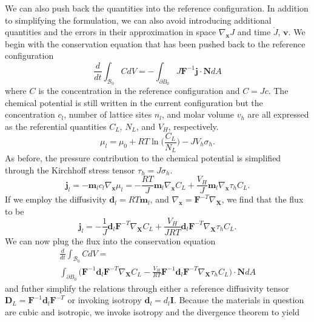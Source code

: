\documentclass[10pt]{elsarticle}
\newcommand{\mbs}[1]{\boldsymbol{#1}}
\def\bs{{\mbs{s}}} \def\bt{{\mbs{t}}} \def\bu{{\mbs{u}}}
\def\bs{\boldsymbol}
\begin{document}
We can also push back the quantities into the reference configuration. In addition to simplifying the formulation, we can also avoid introducing additional quantities and the errors in their approximation in space $\nabla_{\bs{x}}J$ and time  $\dot{J}$, $\bs{v}$. We begin with the conservation equation that has been pushed back to the reference configuration
%
\begin{equation}
\label{eq.hconservationref} \frac{d}{dt} \int_{\mathcal{B}_{0}} C dV = -\int_{\partial B_{0}} J\bs{F}^{-1}\bs{j} \cdot \bs{N} dA 
\end{equation}
where $C$ is the concentration in the reference configuration and $C = Jc$. The chemical potential is still written in the current configuration but the concentration $c_{l}$, number of lattice sites $n_{l}$, and molar volume $v_{h}$ are all expressed as the referential quantities $C_{L}$, $N_{L}$, and $V_{H}$, respectively.
%
\begin{equation}
\label{eq.chemical.potential}{\mu_{l} = \mu_{0} + R T \ln \bigg( \frac{C_{L}}{N_{L}} \bigg) - J V_{h} \sigma_{h}}.
\end{equation}
%
As before, the pressure contribution to the chemical potential is simplified through the Kirchhoff stress tensor $\tau_{h} = J\sigma_{h}$.
%
\begin{equation}
\label{eq.flux.ref}{\bs{j}_{l} = -\bs{m}_{l} c_{l} \nabla_{\bs{x}}\mu_{l}} =  -\frac{R T}{J}\bs{m}_{l}  \nabla_{\bs{x}}C_{L}  + \frac{ V_{H}}{J} \bs{m}_{l}  \nabla_{\bs{x}}\tau_{h}C_{L}.
\end{equation}
%
If we employ the diffusivity $\bs{d}_{l} = RT \bs{m}_{l}$, and $\nabla_{\bs{x}} = \bs{F}^{-T}\nabla_{\bs{X}}$, we find that the flux to be
%
\begin{equation}
\label{eq.flux.ref3}{\bs{j}_{l} = -\frac{1}{J} \bs{d}_{l} \bs{F}^{-T} \nabla_{\bs{X}}C_{L}  + \frac{V_{H}}{J R T} \bs{d}_{l}  \bs{F}^{-T} \nabla_{\bs{X}} \tau_{h}} C
_{L}.
\end{equation}
We can now plug the flux into the conservation equation 
%
\begin{align}
\label{eq.hconservationref2} \frac{d}{dt} \int_{\mathcal{B}_{0}} C dV =  \nonumber \\ \int_{\partial B_{0}} \bigg( \bs{F}^{-1} \bs{d}_{l}   \bs{F}^{-T}  \nabla_{\bs{X}} C_{L} -  \frac{V_{H}}{RT} \bs{F}^{-1} \bs{d}_{l}   \bs{F}^{-T}  \nabla_{\bs{X}}\tau_{h} C_{L} \bigg) \cdot \bs{N} dA 
\end{align}
%
and futher simplify the relations through either a reference diffusivity tensor $\bs{D}_{L} = \bs{F}^{-1} \bs{d}_{l}   \bs{F}^{-T}$ or invoking isotropy $\bs{d}_{l} = d_{l}\bs{I}$. Because the materials in question are cubic and isotropic, we invoke isotropy and the divergence theorem to yield
\end{document}
